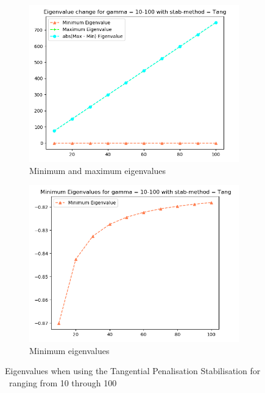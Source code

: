 \begin{figure}[ht]
     \centering
     \begin{subfigure}[h]{0.49\textwidth}
        \centering
\includegraphics[width=\textwidth]{latex/Thesis/media/Gamma_10_thru_100_tang.png}
\caption{Minimum and maximum eigenvalues\label{fig:TangEigHigh}}
     \end{subfigure}
     \hfill
     \begin{subfigure}[h]{0.49\textwidth}
\centering
\includegraphics[width=\textwidth]{latex/Thesis/media/Gamma_10_thru_100_tang_min.png}
\caption{Minimum eigenvalues\label{fig:TangEigHighMin}}
     \end{subfigure}
        \caption{Eigenvalues when using the Tangential Penalisation Stabilisation for \mgamma~ranging from 10 through 100}
        \label{fig:TangEigHighmulti}
\end{figure}





